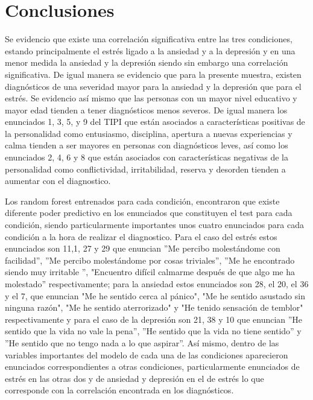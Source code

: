 \section{Conclusiones}

Se evidencio que existe una correlación significativa entre las tres condiciones, estando principalmente el estrés ligado a la ansiedad y a la depresión y en una menor medida la ansiedad y la depresión siendo sin embargo una correlación significativa. De igual manera se evidencio que para la presente muestra, existen diagnósticos de una severidad mayor para la ansiedad y la depresión que para el estrés. Se evidencio así mismo que las personas con un mayor nivel educativo y mayor edad tienden a tener diagnósticos menos severos. De igual manera los enunciados 1, 3, 5, y 9 del TIPI que están asociados a características positivas de la personalidad como entusiasmo, disciplina, apertura a nuevas experiencias y calma tienden a ser mayores en personas con diagnósticos leves, así como los enunciados 2, 4, 6 y 8 que están asociados con características negativas de la personalidad como conflictividad, irritabilidad, reserva y desorden tienden a aumentar con el diagnostico.

\medbreak

Los random forest entrenados para cada condición, encontraron que existe diferente poder predictivo en los enunciados que constituyen el test para cada condición, siendo particularmente importantes unos cuatro enunciados para cada condición a la hora de realizar el diagnostico. Para el caso del estrés estos enunciados son 11,1, 27 y 29 que enuncian ”Me percibo molestándome con facilidad”, ”Me percibo molestándome por cosas triviales”, ”Me he encontrado siendo muy irritable ”, "Encuentro difícil calmarme después de que algo me ha molestado” respectivamente; para la ansiedad estos enunciados son 28, el 20, el 36 y el 7, que enuncian "Me he sentido cerca al pánico", "Me he sentido asustado sin ninguna razón", "Me he sentido aterrorizado" y "He tenido sensación de temblor" respectivamente y para el caso de la depresión son 21, 38 y 10 que enuncian ''He sentido que la vida no vale la pena'',  ''He sentido que la vida no tiene sentido'' y ''He sentido que no tengo nada a lo que aspirar''.  Así mismo, dentro de las variables importantes del modelo de cada una de las condiciones aparecieron enunciados correspondientes a otras condiciones, particularmente enunciados de estrés en las otras dos y de ansiedad y depresión en el de estrés lo que corresponde con la correlación encontrada en los diagnósticos.

